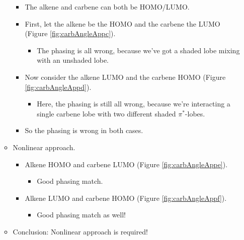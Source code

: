 \documentclass[../notes.tex]{subfiles}
\begin{document}
\begin{itemize}
\begin{itemize}
        \begin{itemize}
            \item The alkene and carbene can both be HOMO/LUMO.
            \item First, let the alkene be the HOMO and the carbene the LUMO (Figure \ref{fig:carbAngleAppc}).
            \begin{itemize}
                \item The phasing is all wrong, because we've got a shaded lobe mixing with an unshaded lobe.
            \end{itemize}
            \pagebreak
            \item Now consider the alkene LUMO and the carbene HOMO (Figure \ref{fig:carbAngleAppd}).
            \begin{itemize}
                \item Here, the phasing is still all wrong, because we're interacting a single carbene lobe with two different shaded $\pi^*$-lobes.
            \end{itemize}
            \item So the phasing is wrong in both cases.
        \end{itemize}
        \item Nonlinear approach.
        \begin{itemize}
            \item Alkene HOMO and carbene LUMO (Figure \ref{fig:carbAngleAppe}).
            \begin{itemize}
                \item Good phasing match.
            \end{itemize}
            \item Alkene LUMO and carbene HOMO (Figure \ref{fig:carbAngleAppf}).
            \begin{itemize}
                \item Good phasing match as well!
            \end{itemize}
        \end{itemize}
        \item Conclusion: Nonlinear approach is required!
    \end{itemize}
\end{itemize}
\end{document}
